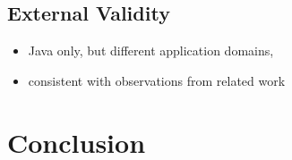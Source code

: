 \subsection{External Validity}
\begin{itemize}
	\item Java only, but different application domains,
	\item consistent with observations from related work
\end{itemize}
\section{Conclusion}
